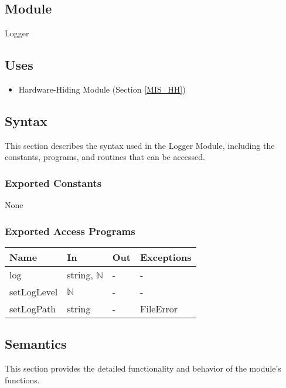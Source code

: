 \documentclass[12pt, titlepage]{article}
\begin{document}
\subsection{Module}

Logger

\subsection{Uses}

\begin{itemize}
\item Hardware-Hiding Module (Section \ref{MIS_HH})
\end{itemize}

\subsection{Syntax}

This section describes the syntax used in the Logger Module, including the
constants, programs, and routines that can be accessed.

\subsubsection{Exported Constants}

None

\subsubsection{Exported Access Programs}

\begin{center}
\begin{tabular}{p{2cm} p{4cm} p{4cm} p{2cm}}
\hline
\textbf{Name} & \textbf{In} & \textbf{Out} & \textbf{Exceptions} \\
\hline
log & string, $\mathbb{N}$ & - & - \\
setLogLevel & $\mathbb{N}$ & - & - \\
setLogPath & string & - & FileError \\
\hline
\end{tabular}
\end{center}

\subsection{Semantics}

This section provides the detailed functionality and behavior of the module’s
functions.
\end{document}
